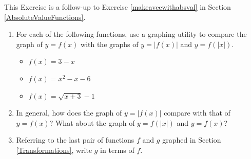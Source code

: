 \documentclass{ximera}
\begin{document}
\begin{problem}\label{relatedbyabsexercise}
This Exercise is a follow-up to Exercise \ref{makeaveewithabsval} in Section \ref{AbsoluteValueFunctions}.
\begin{enumerate}

\item For each of the following functions, use a graphing utility to compare the graph of $y = f(x)$ with the graphs of $y = |f(x)|$ and $y = f(|x|)$. 


\begin{itemize}

\item $f(x) = 3-x$

\item $f(x) = x^2-x-6$

\item $f(x) = \sqrt{x+3} - 1$

\end{itemize}

\item  In general, how does the graph of $y = |f(x)|$ compare with that of $y = f(x)$?  What about the graph of $y = f(|x|)$ and $y = f(x)$?

\item  Referring to the last pair of functions $f$ and $g$ graphed in Section \ref{Transformations}, write $g$ in terms of $f$.

\end{enumerate}
\end{problem}
\end{document}
